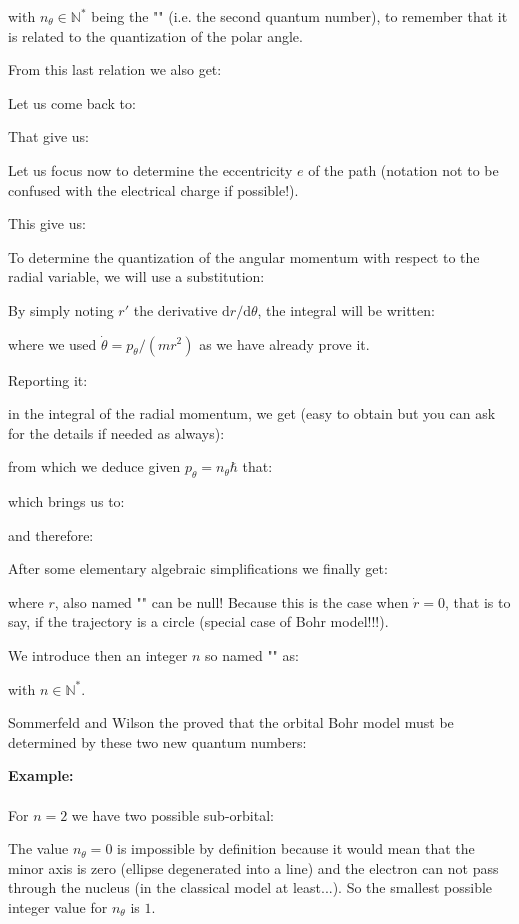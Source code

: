 	with $n_\theta \in \mathbb{N}^*$ being the "" (i.e. the second quantum number), to remember that it is related to the quantization of the polar angle.
	
	From this last relation we also get:
	
	Let us come back to:
	
	That give us:
	
	Let us focus now to determine the eccentricity $e$ of the path (notation not to be confused with the electrical charge if possible!).
	
	This give us:
	
	To determine the quantization of the angular momentum with respect to the radial variable, we will use a substitution:
	
	By simply noting $r'$ the derivative $\mathrm{d}r/\mathrm{d}\theta$, the integral will be written:
	
	where we used $\dot{\theta}=p_\theta/(mr^2)$ as we have already prove it.
	
	Reporting it:
	
	in the integral of the radial momentum, we get (easy to obtain but you can ask for the details if needed as always):
	
	from which we deduce given $p_\theta=n_\theta\hbar$ that:
	
	which brings us to:
	
	and therefore:
	
	After some elementary algebraic simplifications we finally get:
	
	where $r$, also named "" can be null! Because this is the case when $\dot{r}=0$, that is to say, if the trajectory is a circle (special case of Bohr model!!!).
	
	We introduce then an integer $n$ so named "" as:
	
	with $n\in \mathbb{N}^*$.
	
	Sommerfeld and Wilson the proved that the orbital Bohr model must be determined by these two new quantum numbers:
	\begin{tcolorbox}[colframe=black,colback=white,sharp corners]
	\textbf{{\Large {}}Example:}\\\\
	For $n=2$ we have two possible sub-orbital:
	
	\end{tcolorbox}
	The value $n_\theta=0$ is impossible by definition because it would mean that the minor axis is zero (ellipse degenerated into a line) and the electron can not pass through the nucleus (in the classical model at least...). So the smallest possible integer value for $n_\theta$ is $1$.
	
